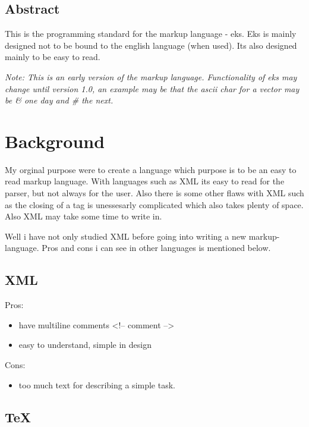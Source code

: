 \documentclass{book}
\begin{document}
	\section*{Abstract}
	
	This is the programming standard for the markup language - eks. 
	Eks is mainly designed not to be bound to the english language (when used). Its also designed mainly to be easy to read.
	
	\emph{Note: This is an early version of the markup language. Functionality of eks may change until version 1.0, an example may be that the ascii char for a vector may be \& one day and # the next.}
	
	\newpage
	
	\tableofcontents
	\newpage
	
	\chapter{Background}
	
	My orginal purpose were to create a language which purpose is to be an easy to read markup language. 
	With languages such as XML its easy to read for the parser, but not always for the user. 
	Also there is some other flaws with XML such as the closing of a tag is unessesarly complicated which also takes plenty of space.
	Also XML may take some time to write in. 
	
	Well i have not only studied XML before going into writing a new markup-language.
	Pros and cons i can see in other languages is mentioned below.

	\section{XML}
	
	Pros:
	
	\begin{itemize}
		\item have multiline comments <!-- comment -->
		\item easy to understand, simple in design
	\end{itemize}
	
	Cons:
	
	\begin{itemize}
		\item too much text for describing a simple task.
	\end{itemize}
	
	\section{TeX}
	
\end{document}

